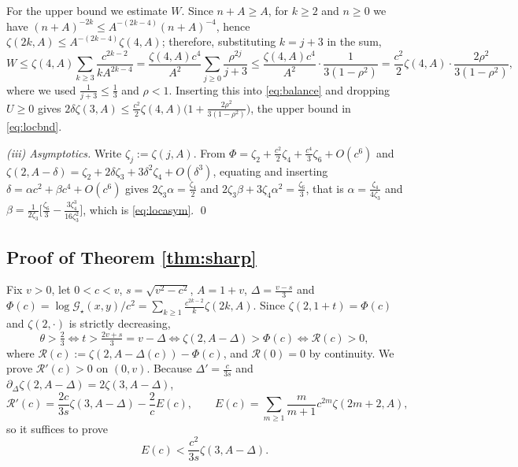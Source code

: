 \documentclass[11pt,a4paper]{amsart}
\theoremstyle{definition}
\newcommand{\Gs}{\mathcal{G}_{\star}}
\begin{document}
For the upper bound we estimate $W$. Since $n+A\ge A$, for $k\ge2$ and $n\ge0$ we have
$(n+A)^{-2k}\le A^{-(2k-4)}(n+A)^{-4}$, hence $\zeta(2k,A)\le A^{-(2k-4)}\zeta(4,A)$;
therefore, substituting $k=j+3$ in the sum,
\[
  W\le\zeta(4,A)\sum_{k\ge3}\frac{c^{2k-2}}{kA^{2k-4}}
   =\frac{\zeta(4,A)c^{4}}{A^{2}}\sum_{j\ge0}\frac{\rho^{2j}}{j+3}
   \le\frac{\zeta(4,A)c^{4}}{A^{2}}\cdot\frac{1}{3(1-\rho^{2})}
   =\frac{c^{2}}{2}\zeta(4,A)\cdot\frac{2\rho^{2}}{3(1-\rho^{2})},
\]
where we used $\frac{1}{j+3}\le\frac13$ and $\rho<1$. Inserting this into
\eqref{eq:balance} and dropping $U\ge0$ gives
$2\delta\zeta(3,A)\le\frac{c^{2}}{2}\zeta(4,A)\big(1+\frac{2\rho^{2}}{3(1-\rho^{2})}\big)$,
the upper bound in \eqref{eq:locbnd}.

\emph{(iii) Asymptotics.} Write $\zeta_{j}:=\zeta(j,A)$. From
$\Phi=\zeta_{2}+\frac{c^{2}}{2}\zeta_{4}+\frac{c^{4}}{3}\zeta_{6}+O(c^{6})$ and
$\zeta(2,A-\delta)=\zeta_{2}+2\delta\zeta_{3}+3\delta^{2}\zeta_{4}+O(\delta^{3})$,
equating and inserting $\delta=\alpha c^{2}+\beta c^{4}+O(c^{6})$ gives
$2\zeta_{3}\alpha=\frac{\zeta_{4}}{2}$ and
$2\zeta_{3}\beta+3\zeta_{4}\alpha^{2}=\frac{\zeta_{6}}{3}$, that is
$\alpha=\frac{\zeta_{4}}{4\zeta_{3}}$ and
$\beta=\frac{1}{2\zeta_{3}}\big[\frac{\zeta_{6}}{3}
-\frac{3\zeta_{4}^{3}}{16\zeta_{3}^{2}}\big]$, which is \eqref{eq:locasym}. \qed

\subsection{Proof of Theorem \ref{thm:sharp}}
Fix $v>0$, let $0<c<v$, $s=\sqrt{v^{2}-c^{2}}$, $A=1+v$, $\Delta=\frac{v-s}{3}$ and
$\Phi(c)=\log\Gs(x,y)/c^{2}=\sum_{k\ge1}\frac{c^{2k-2}}{k}\zeta(2k,A)$. Since
$\zeta(2,1+t)=\Phi(c)$ and $\zeta(2,\cdot)$ is strictly decreasing,
\[
  \theta>\tfrac23\iff t>\tfrac{2v+s}{3}=v-\Delta
  \iff\zeta(2,A-\Delta)>\Phi(c)\iff\mathcal{R}(c)>0 ,
\]
where $\mathcal{R}(c):=\zeta(2,A-\Delta(c))-\Phi(c)$, and $\mathcal{R}(0)=0$ by continuity.
We prove $\mathcal{R}'(c)>0$ on $(0,v)$. Because
$\Delta'=\frac{c}{3s}$ and $\partial_{\Delta}\zeta(2,A-\Delta)=2\zeta(3,A-\Delta)$,
\begin{equation}\label{eq:Rp}
  \mathcal{R}'(c)=\frac{2c}{3s}\zeta(3,A-\Delta)-\frac{2}{c}E(c),\qquad
  E(c)=\sum_{m\ge1}\frac{m}{m+1}c^{2m}\zeta(2m+2,A),
\end{equation}
so it suffices to prove
\begin{equation}\label{eq:target}
  E(c)<\frac{c^{2}}{3s}\zeta(3,A-\Delta).
\end{equation}
\end{document}
